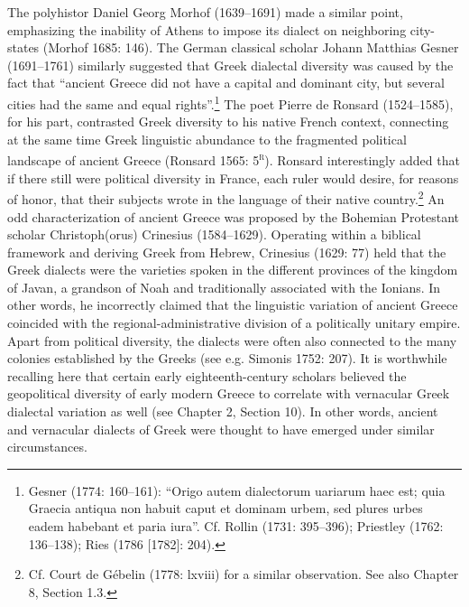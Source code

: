 \documentclass[12pt]{article}
\newenvironment{styleStandard}{\renewcommand\baselinestretch{1.25}\setlength\leftskip{0in}\setlength\rightskip{0in}\setlength\parindent{0.1972in}\setlength\parfillskip{0pt plus 1fil}\setlength\parskip{0in plus 1pt}\writerlistparindent\writerlistleftskip\leavevmode\normalfont\normalsize\writerlistlabel\ignorespaces}{\unskip\vspace{0in plus 1pt}\par}
\newcommand\writerlistleftskip{}
\newcommand\writerlistparindent{}
\newcommand\writerlistlabel{}
\begin{document}
\begin{styleStandard}
The polyhistor Daniel Georg Morhof (1639–1691) made a similar point, emphasizing the inability of Athens to impose its dialect on neighboring city-states (Morhof 1685: 146). The German classical scholar Johann Matthias Gesner (1691–1761) similarly suggested that Greek dialectal diversity was caused by the fact that “ancient Greece did not have a capital and dominant city, but several cities had the same and equal rights”.\footnote{ Gesner (1774: 160–161): “Origo autem dialectorum uariarum haec est; quia Graecia antiqua non habuit caput et dominam urbem, sed plures urbes eadem habebant et paria iura”. Cf. Rollin (1731: 395–396); Priestley (1762: 136–138); Ries (1786 [1782]: 204).} The poet Pierre de Ronsard (1524–1585), for his part, contrasted Greek diversity to his native French context, connecting at the same time Greek linguistic abundance to the fragmented political landscape of ancient Greece (Ronsard 1565: 5\textsc{\textsuperscript{r}}). Ronsard interestingly added that if there still were political diversity in France, each ruler would desire, for reasons of honor, that their subjects wrote in the language of their native country.\footnote{ Cf. Court de Gébelin (1778: lxviii) for a similar observation. See also Chapter 8, Section 1.3.} An odd characterization of ancient Greece was proposed by the Bohemian Protestant scholar Christoph(orus) Crinesius (1584–1629). Operating within a biblical framework and deriving Greek from Hebrew, Crinesius (1629: 77) held that the Greek dialects were the varieties spoken in the different provinces of the kingdom of Javan, a grandson of Noah and traditionally associated with the Ionians. In other words, he incorrectly claimed that the linguistic variation of ancient Greece coincided with the regional-administrative division of a politically unitary empire. Apart from political diversity, the dialects were often also connected to the many colonies established by the Greeks (see e.g. Simonis 1752: 207). It is worthwhile recalling here that certain early eighteenth-century scholars believed the geopolitical diversity of early modern Greece to correlate with vernacular Greek dialectal variation as well (see Chapter 2, Section 10). In other words, ancient and vernacular dialects of Greek were thought to have emerged under similar circumstances.
\end{styleStandard}
\end{document}

